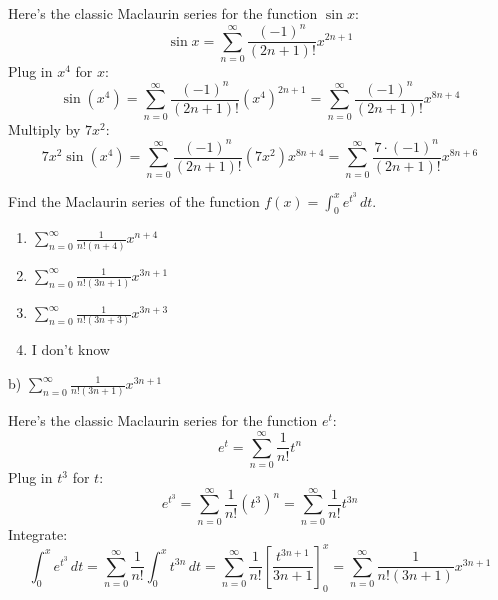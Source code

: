 \documentclass[addpoints,12pt,answers]{exam}
\begin{document}
\begin{questions}
\begin{solution}
    Here's the classic Maclaurin series for the function $\sin x$:
    $$\sin x=\sum_{n=0}^\infty\frac{(-1)^n}{(2n+1)!}x^{2n+1}$$
    Plug in $x^4$ for $x$:
    $$\sin(x^4)=\sum_{n=0}^\infty\frac{(-1)^n}{(2n+1)!}(x^4)^{2n+1}=\sum_{n=0}^\infty\frac{(-1)^n}{(2n+1)!}x^{8n+4}$$
    Multiply by $7x^2$:
    $$7x^2\sin(x^4)=\sum_{n=0}^\infty\frac{(-1)^n}{(2n+1)!}(7x^2)x^{8n+4}=\sum_{n=0}^\infty\frac{7\cdot(-1)^n}{(2n+1)!}x^{8n+6}$$
  \end{solution}
  \newpage
  \question
  Find the Maclaurin series of the function $\displaystyle f(x)=\int_0^x e^{t^3}\,dt$.
  \begin{enumerate}[label=\alph*)]
    \item
    $\displaystyle\sum_{n=0}^\infty\frac{1}{n!(n+4)}x^{n+4}$
    \item
    $\displaystyle\sum_{n=0}^\infty\frac{1}{n!(3n+1)}x^{3n+1}$
    \item
    $\displaystyle\sum_{n=0}^\infty\frac{1}{n!(3n+3)}x^{3n+3}$
    \item
    I don't know
  \end{enumerate}
  \begin{solution}
    b) $\displaystyle\sum_{n=0}^\infty\frac{1}{n!(3n+1)}x^{3n+1}$
    
    Here's the classic Maclaurin series for the function $e^t$:
    $$e^t=\sum_{n=0}^\infty\frac{1}{n!}t^n$$
    Plug in $t^3$ for $t$:
    $$e^{t^3}=\sum_{n=0}^\infty\frac{1}{n!}(t^3)^n=\sum_{n=0}^\infty\frac{1}{n!}t^{3n}$$
    Integrate:
    $$\int_0^x e^{t^3}\,dt=\sum_{n=0}^\infty\frac{1}{n!}\int_0^x t^{3n}\,dt=\sum_{n=0}^\infty\frac{1}{n!}\left[\frac{t^{3n+1}}{3n+1}\right]_0^x=\sum_{n=0}^\infty\frac{1}{n!(3n+1)}x^{3n+1}$$
  \end{solution}
  \newpage
\end{questions}
\end{document}
